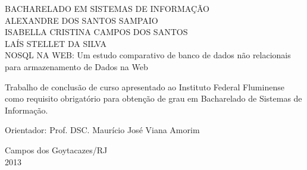 \begin{titlepage}
 \begin{figure}[ht]
 \centering
 \end{figure}
 \begin{center}
   {\large BACHARELADO EM SISTEMAS DE INFORMAÇÃO} \\ [3.5cm]
   {\large ALEXANDRE DOS SANTOS SAMPAIO} \\ [0.5cm]
   {\large ISABELLA CRISTINA CAMPOS DOS SANTOS} \\ [0.5cm]
   {\large LAÍS STELLET DA SILVA} \\ [2.5cm]
   {\large NOSQL NA WEB: Um estudo comparativo de banco de dados não relacionais para armazenamento de Dados na Web } \\[1.5cm]
   \hspace{.45\textwidth} %
   \begin{minipage}{0.5\textwidth}
   \begin{espacosimples}
        Trabalho de conclusão de curso apresentado ao Instituto Federal Fluminense como requisito obrigatório para obtenção de grau em Bacharelado de Sistemas de Informação.\\[1.5cm]
   	\end{espacosimples}
        \centering Orientador: Prof. DSC. Maurício José Viana Amorim \\
    
    \end{minipage}
   \vfill
   {\large Campos dos Goytacazes/RJ} \\
   {\large 2013}
 \end{center}
\end{titlepage}
